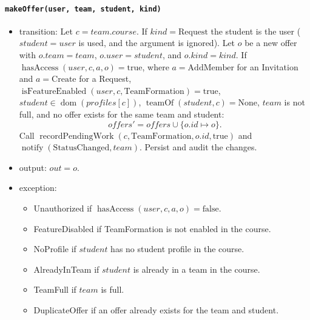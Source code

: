 \documentclass[12pt, titlepage]{article}
\begin{document}
\paragraph{\texttt{makeOffer(user, team, student, kind)}}
\begin{itemize}
    \item transition: Let $c=team.course$. If $kind=\text{Request}$ the student is the user ($student=user$ is used, and the argument is ignored). Let $o$ be a new offer with $o.team=team$, $o.user=student$, and $o.kind=kind$. If $\operatorname{hasAccess}(user,c,a,o)=\text{true}$, where $a=\text{AddMember}$ for an Invitation and $a=\text{Create}$ for a Request, $\operatorname{isFeatureEnabled}(user,c,\text{TeamFormation})=\text{true}$, $student\in\operatorname{dom}(\mathit{profiles}[c])$, $\operatorname{teamOf}(student,c)=\text{None}$, $team$ is not full, and no offer exists for the same team and student:
    \[
    \mathit{offers}'=\mathit{offers}\cup\{o.id\mapsto o\}.
    \]
    Call $\operatorname{recordPendingWork}(c,\text{TeamFormation},o.id,\text{true})$ and $\operatorname{notify}(\text{StatusChanged},team)$. Persist and audit the changes.
    \item output: $out=o$.
    \item exception:
    \begin{itemize}
        \item Unauthorized if $\operatorname{hasAccess}(user,c,a,o)=\text{false}$.
        \item FeatureDisabled if TeamFormation is not enabled in the course.
        \item NoProfile if $student$ has no student profile in the course.
        \item AlreadyInTeam if $student$ is already in a team in the course.
        \item TeamFull if $team$ is full.
        \item DuplicateOffer if an offer already exists for the team and student.
    \end{itemize}
\end{itemize}
\end{document}
